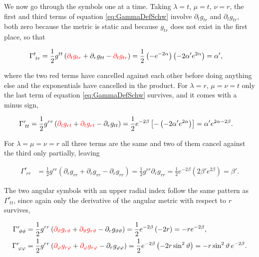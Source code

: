         We now go through the symbols one at a time. Taking $\lambda=t$, $\mu=t$, $\nu=r$, the first and third terms of equation \ref{eq:GammaDefSchw} involve $\partial_tg_{tr}$ and $\partial_tg_{tr}$, both zero because the metric is static and because $g_{tr}$ does not exist in the first place, so that

        \begin{align*}
            \Gamma^{t}_{\;tr} &= \frac{1}{2}g^{tt}\left({\color{red}\partial_tg_{tr}} + \partial_rg_{tt} - {\color{red}\partial_tg_{tr}}\right) = \frac{1}{2}\left(-e^{-2\alpha}\right)\left(-2\alpha'e^{2\alpha}\right) = \alpha',
        \end{align*}

        where the two red terms have cancelled against each other before doing anything else and the exponentials have cancelled in the product. For $\lambda=r$, $\mu=\nu=t$ only the last term of equation \ref{eq:GammaDefSchw} survives, and it comes with a minus sign,

        \begin{align*}
            \Gamma^{r}_{\;tt} &= \frac{1}{2}g^{rr}\left({\color{red}\partial_tg_{rt}} + {\color{red}\partial_tg_{rt}} - \partial_rg_{tt}\right) = \frac{1}{2}e^{-2\beta}\left[-\left(-2\alpha'e^{2\alpha}\right)\right] = \alpha'e^{2\alpha-2\beta}.
        \end{align*}

        For $\lambda=\mu=\nu=r$ all three terms are the same and two of them cancel against the third only partially, leaving

        \begin{align*}
            \Gamma^{r}_{\;rr} &= \frac{1}{2}g^{rr}\left(\partial_rg_{rr} + \partial_rg_{rr} - \partial_rg_{rr}\right) = \frac{1}{2}g^{rr}\partial_rg_{rr} = \frac{1}{2}e^{-2\beta}\left(2\beta'e^{2\beta}\right) = \beta'.
        \end{align*}

        The two angular symbols with an upper radial index follow the same pattern as $\Gamma^r_{\;tt}$, since again only the derivative of the angular metric with respect to $r$ survives,

        \begin{align*}
            \Gamma^{r}_{\;\vartheta\vartheta} &= \frac{1}{2}g^{rr}\left({\color{red}\partial_{\vartheta}g_{r\vartheta}} + {\color{red}\partial_{\vartheta}g_{r\vartheta}} - \partial_rg_{\vartheta\vartheta}\right) = \frac{1}{2}e^{-2\beta}\left(-2r\right) = -re^{-2\beta},\\
            \Gamma^{r}_{\;\varphi\varphi} &= \frac{1}{2}g^{rr}\left({\color{red}\partial_{\varphi}g_{r\varphi}} + {\color{red}\partial_{\varphi}g_{r\varphi}} - \partial_rg_{\varphi\varphi}\right) = \frac{1}{2}e^{-2\beta}\left(-2r\sin^2\vartheta\right) = -r\sin^2\vartheta\, e^{-2\beta}.
        \end{align*}

